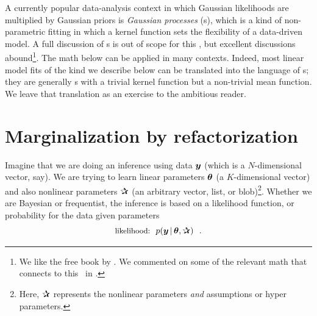 A currently popular data-analysis context in which Gaussian likelihoods are
multiplied by Gaussian priors is \emph{Gaussian processes} (s),
which is a kind of
non-parametric fitting in which a kernel function sets the flexibility of a
data-driven model. A full discussion of s is out of scope for this
\documentname, but excellent discussions abound\footnote{We like the free
  book by \cite{Rasmussen:2005}. We commented on some of the relevant math that
  connects to this \documentname\ in \cite{luger}.}.
The math below can be applied in many  contexts.
Indeed, most linear model fits of the kind we describe below can be translated
into the language of s;
they are generally s with a trivial kernel function but a non-trivial
mean function. We leave that translation as an exercise to the ambitious reader.

\section{Marginalization by refactorization}

Imagine that we are doing an inference using data $\boldsymbol{y}$ (which is a
$N$-dimensional vector, say).
We are trying to learn linear parameters $\boldsymbol{\theta}$ (a $K$-dimensional vector)
and also nonlinear parameters $\bP$ (an arbitrary vector, list, or
blob)\footnote{Here, $\bP$ represents the nonlinear parameters \emph{and}
assumptions or hyper parameters.}.
Whether we are Bayesian or frequentist, the inference is based on
a likelihood function, or probability for the data given parameters
\begin{equation}
\mbox{\small likelihood:} \hquad p(\vy\given\vtheta,\bP) \hquad.
\end{equation}

